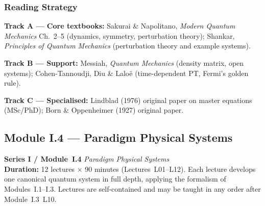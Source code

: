 \documentclass[11pt,a4paper]{article}
\begin{document}
\subsubsection*{Reading Strategy}

\noindent\textbf{Track A --- Core textbooks:}
Sakurai \& Napolitano, \textit{Modern Quantum Mechanics} Ch.~2--5 (dynamics, symmetry, perturbation theory);
Shankar, \textit{Principles of Quantum Mechanics} (perturbation theory and example systems).

\noindent\textbf{Track B --- Support:}
Messiah, \textit{Quantum Mechanics} (density matrix, open systems);
Cohen-Tannoudji, Diu \& Lalo\"e (time-dependent PT, Fermi's golden rule).

\noindent\textbf{Track C --- Specialised:}
Lindblad (1976) original paper on master equations (MSc/PhD);
Born \& Oppenheimer (1927) original paper.

\newpage

\subsection{Module I.4 --- Paradigm Physical Systems}
\label{sec:mod-I4}

\begin{tcolorbox}[seriesbox]
  \textbf{Series I / Module~I.4} \quad
  \textit{Paradigm Physical Systems}\\[4pt]
  \textbf{Duration:} 12 lectures $\times$ 90 minutes (Lectures~L01--L12).
  Each lecture develops one canonical quantum system in full depth, applying
  the formalism of Modules~I.1--I.3. Lectures are self-contained and may be
  taught in any order after Module~I.3~L10.
\end{tcolorbox}

\medskip
\end{document}
